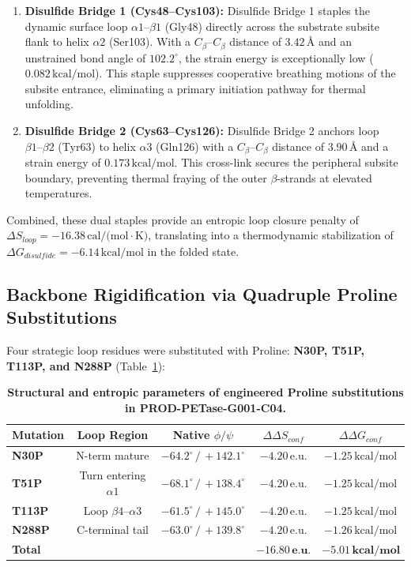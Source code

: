 \documentclass[10pt,twocolumn,a4paper]{article}
\begin{document}
\begin{enumerate}
    \item \textbf{Disulfide Bridge 1 (Cys48--Cys103):} Disulfide Bridge 1 staples the dynamic surface loop $\alpha1\text{--}\beta1$ (Gly48) directly across the substrate subsite flank to helix $\alpha2$ (Ser103). With a $C_\beta\text{--}C_\beta$ distance of $3.42\,\text{\AA}$ and an unstrained bond angle of $102.2^\circ$, the strain energy is exceptionally low ($0.082\,\text{kcal/mol}$). This staple suppresses cooperative breathing motions of the subsite entrance, eliminating a primary initiation pathway for thermal unfolding.
    \item \textbf{Disulfide Bridge 2 (Cys63--Cys126):} Disulfide Bridge 2 anchors loop $\beta1\text{--}\beta2$ (Tyr63) to helix $\alpha3$ (Gln126) with a $C_\beta\text{--}C_\beta$ distance of $3.90\,\text{\AA}$ and a strain energy of $0.173\,\text{kcal/mol}$. This cross-link secures the peripheral subsite boundary, preventing thermal fraying of the outer $\beta$-strands at elevated temperatures.
\end{enumerate}

Combined, these dual staples provide an entropic loop closure penalty of $\Delta S_{loop} = -16.38\,\text{cal/(mol}\cdot\text{K)}$, translating into a thermodynamic stabilization of $\Delta G_{disulfide} = -6.14\,\text{kcal/mol}$ in the folded state.

\subsection{Backbone Rigidification via Quadruple Proline Substitutions}
Four strategic loop residues were substituted with Proline: \textbf{N30P, T51P, T113P, and N288P} (Table~\ref{tab:prolines}):

\begin{table}[H]
\centering
\small
\caption{\textbf{Structural and entropic parameters of engineered Proline substitutions in PROD-PETase-G001-C04.}}
\label{tab:prolines}
\begin{tabular}{lcccc}
\toprule
\textbf{Mutation} & \textbf{Loop Region} & \textbf{Native $\phi/\psi$} & \textbf{$\Delta\Delta S_{conf}$} & \textbf{$\Delta\Delta G_{conf}$} \\
\midrule
\textbf{N30P} & N-term mature & $-64.2^\circ\,/\,+142.1^\circ$ & $-4.20\,\text{e.u.}$ & $-1.25\,\text{kcal/mol}$ \\
\textbf{T51P} & Turn entering $\alpha1$ & $-68.1^\circ\,/\,+138.4^\circ$ & $-4.20\,\text{e.u.}$ & $-1.25\,\text{kcal/mol}$ \\
\textbf{T113P} & Loop $\beta4\text{--}\alpha3$ & $-61.5^\circ\,/\,+145.0^\circ$ & $-4.20\,\text{e.u.}$ & $-1.25\,\text{kcal/mol}$ \\
\textbf{N288P} & C-terminal tail & $-63.0^\circ\,/\,+139.8^\circ$ & $-4.20\,\text{e.u.}$ & $-1.26\,\text{kcal/mol}$ \\
\midrule
\textbf{Total} & & & $\mathbf{-16.80\,\text{e.u.}}$ & $\mathbf{-5.01\,\text{kcal/mol}}$ \\
\bottomrule
\end{tabular}
\end{table}
\end{document}

